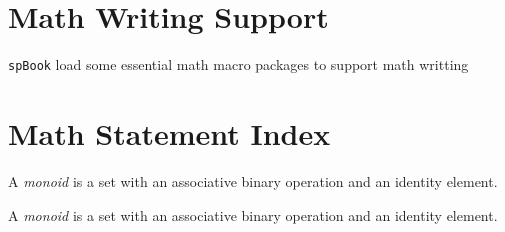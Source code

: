 
    \section{Math Writing Support}
        \texttt{spBook} load some essential math macro packages to support math writting

    \section{Math Statement Index}
        \begin{definition}[Monoid]
            A \emph{monoid} is a set with an associative binary operation and an identity element.
        \end{definition}
        \begin{theorem}[Schur]
            A \emph{monoid} is a set with an associative binary operation and an identity element.
        \end{theorem}